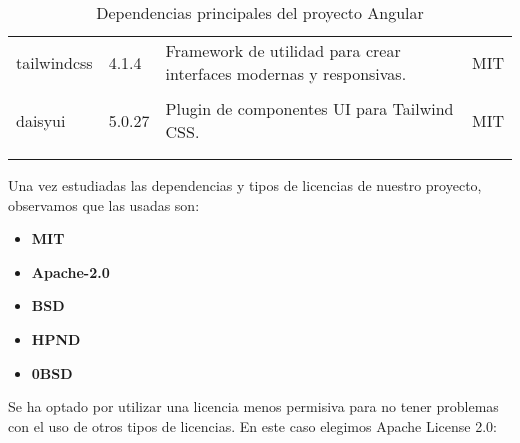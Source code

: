 \begin{longtable}[]{@{}p{}p{}p{}p{}@{}}
    \begin{minipage}[t]{0.18\columnwidth}\raggedright tailwindcss \end{minipage} & \begin{minipage}[t]{0.10\columnwidth}\raggedright 4.1.4 \end{minipage} & \begin{minipage}[t]{0.49\columnwidth}\raggedright Framework de utilidad para crear interfaces modernas y responsivas. \end{minipage} & \begin{minipage}[t]{0.11\columnwidth}\raggedright MIT \end{minipage} \\ \tabularnewline

    \begin{minipage}[t]{0.18\columnwidth}\raggedright daisyui \end{minipage} & \begin{minipage}[t]{0.10\columnwidth}\raggedright 5.0.27 \end{minipage} & \begin{minipage}[t]{0.49\columnwidth}\raggedright Plugin de componentes UI para Tailwind CSS. \end{minipage} & \begin{minipage}[t]{0.11\columnwidth}\raggedright MIT \end{minipage} \\ \tabularnewline
    \bottomrule
    \caption{Dependencias principales del proyecto Angular}
\end{longtable}

Una vez estudiadas las dependencias y tipos de licencias de nuestro proyecto, observamos que las usadas son:

\begin{itemize}
    \item \textbf{MIT}
    \item \textbf{Apache-2.0}
    \item \textbf{BSD}
    \item \textbf{HPND}
    \item \textbf{0BSD}
\end{itemize}

Se ha optado por utilizar una licencia menos permisiva para no tener problemas con el uso de otros tipos de licencias.
En este caso elegimos Apache License 2.0\cite{apacheLicense}:

